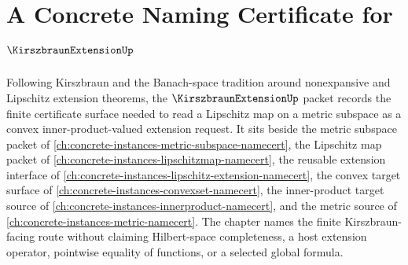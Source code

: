 \chapter{A Concrete Naming Certificate for $\KirszbraunExtensionUp$}
\label{ch:concrete-instances-kirszbraun-extension-namecert}

Following Kirszbraun and the Banach-space tradition around nonexpansive and Lipschitz extension theorems, the $\KirszbraunExtensionUp$ packet records the finite certificate surface needed to read a Lipschitz map on a metric subspace as a convex inner-product-valued extension request. It sits beside the metric subspace packet of \autoref{ch:concrete-instances-metric-subspace-namecert}, the Lipschitz map packet of \autoref{ch:concrete-instances-lipschitzmap-namecert}, the reusable extension interface of \autoref{ch:concrete-instances-lipschitz-extension-namecert}, the convex target surface of \autoref{ch:concrete-instances-convexset-namecert}, the inner-product target source of \autoref{ch:concrete-instances-innerproduct-namecert}, and the metric source of \autoref{ch:concrete-instances-metric-namecert}. The chapter names the finite Kirszbraun-facing route without claiming Hilbert-space completeness, a host extension operator, pointwise equality of functions, or a selected global formula.

